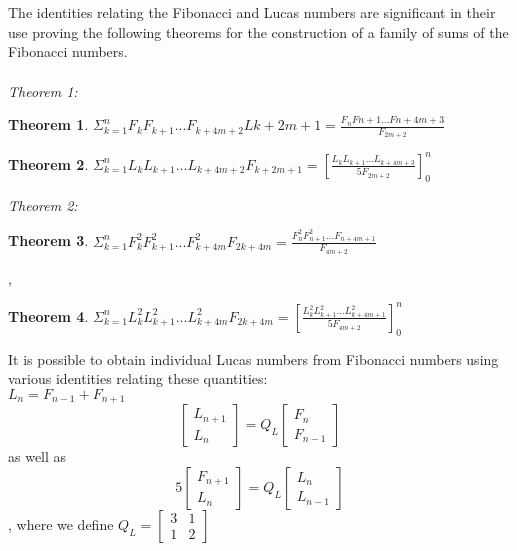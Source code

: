 \documentclass[11pt]{article}
\newtheorem{theorem}{Theorem}
\begin{document}
\\
\\
The identities relating the Fibonacci and Lucas numbers are significant in their use proving the following theorems for the construction of a family of sums of the Fibonacci numbers.\\ \\
\textit{Theorem 1:}  
\begin{theorem}
$\Sigma_{k=1}^{n} F_{k}F_{k+1}...F_{k+4m+2}L{k+2m+1} = \frac{F_{n}F{n+1}...F{n+4m+3}}{F_{2m+2}}$
\end{theorem} 

\begin{theorem}
$\Sigma_{k=1}^{n} L_{k}L_{k+1}...L_{k+4m+2}F_{k+2m+1}=[\frac{L_{k}L_{k+1}...L_{k+4m+3}}{5F_{2m+2}}]_{0}^n$
\end{theorem}

\textit{Theorem 2:}

\begin{theorem}
$\Sigma_{k=1}^n F_{k}^2F_{k+1}^2...F_{k+4m}^2F_{2k+4m}=\frac{F_{n}^2F_{n+1}^2...F_{n+4m+1}}{F_{4m+2}}$
\end{theorem},\\

\begin{theorem}
$\Sigma_{k=1}^n L_{k}^2L_{k+1}^2...L_{k+4m}^2F_{2k+4m}=[\frac{L_{k}^2L_{k+1}^2...L_{k+4m+1}^2}{5F_{4m+2}}]_{0}^n$
\end{theorem} It is possible to obtain individual Lucas numbers from Fibonacci numbers using various identities relating these quantities:\\$L_{n} = F_{n-1} + F_{n+1}$ \\ 
\[
\begin{bmatrix}
L_{n+1} \\
L_{n}
\end{bmatrix} = Q_{L} \begin{bmatrix} F_{n} \\ F_{n-1}\end{bmatrix}
\] 
as well as \\
\[
5\begin{bmatrix}
F_{n+1} \\
L_{n}
\end{bmatrix} = Q_{L} \begin{bmatrix} L_{n} \\ L_{n-1}\end{bmatrix}
\] , where we define $Q_{L} = \begin{bmatrix} 3 & 1 \\ 1 & 2 \end{bmatrix}$
\end{document}
